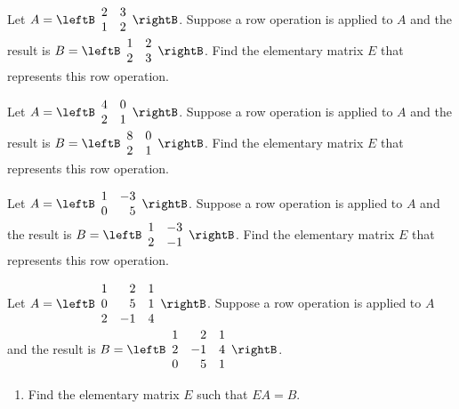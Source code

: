 \begin{enumialphparenastyle}

\begin{ex}
Let $A = \leftB \begin{array}{rr}
2 & 3 \\
1 & 2 
\end{array}\rightB$. Suppose a row operation is applied to $A$ and the result is $B = \leftB \begin{array}{rr}
1 & 2 \\
2 & 3 
\end{array}\rightB$. Find the elementary matrix $E$ that represents this row operation. 
\end{ex}

\begin{ex} 
Let $A = \leftB \begin{array}{rr}
4 & 0 \\
2 & 1 
\end{array}\rightB$. Suppose a row operation is applied to $A$ and the result is $B = \leftB \begin{array}{rr}
8 & 0 \\
2 & 1 
\end{array}\rightB$. Find the elementary matrix $E$ that represents this row operation. 
\end{ex}

\begin{ex} 
Let $A = \leftB \begin{array}{rr}
1 & -3 \\
0 & 5 
\end{array}\rightB$. Suppose a row operation is applied to $A$ and the result is $B = \leftB \begin{array}{rr}
1 & -3 \\
2 & -1 
\end{array}\rightB$. Find the elementary matrix $E$ that represents this row operation. 
\end{ex}

\begin{ex} 
Let $A = \leftB \begin{array}{rrr}
1 & 2 & 1  \\
0 & 5 & 1 \\
2 & -1 & 4
\end{array}\rightB$. Suppose a row operation is applied to $A$ and the result is $B = \leftB \begin{array}{rrr}
1 & 2 & 1\\
2 & -1 & 4 \\
0 & 5 & 1  
\end{array}\rightB$. 
\begin{enumerate}
\item Find the elementary matrix $E$ such that $EA = B$. 


\end{enumerate}
\end{ex}
\end{enumialphparenastyle}
